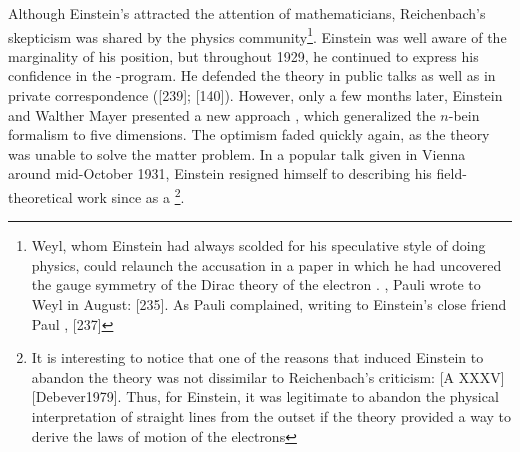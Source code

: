 \documentclass[final]{article}
\newcommand{\nbein}{$n$-bein\xspace}
\newcommand{\FP}{\german{Fernparallelismus}\xspace}
\begin{document}
Although Einstein's \FP attracted the attention of mathematicians, Reichenbach's skepticism was shared by the physics community\footnote{Weyl, whom Einstein had always scolded for his speculative style of doing physics, could relaunch the accusation in a paper \citep{Weyl1929c} in which he had uncovered the gauge symmetry of the Dirac theory of the electron . , Pauli wrote to Weyl in August:  [235]. As Pauli complained, writing to Einstein's close friend Paul \Ehr,  [237]}. Einstein was well aware of the marginality of his position, but throughout 1929, he continued to express his confidence in the \FP-program. He defended the theory in public talks \citep{Einstein1930,Einstein1930a,Einstein1930b} as well as in private correspondence ([239]; [140]). However, only a few months later, Einstein and Walther Mayer presented a new approach \citep{Einstein1931}, which generalized the \nbein formalism to five dimensions. The optimism faded quickly again, as the theory was unable to solve the matter problem. In a popular talk given in Vienna around mid-October 1931, Einstein resigned himself to describing his field-theoretical work since \gr as a  \citep[441]{Einstein1932b}\footnote{It is interesting to notice that one of the reasons that induced Einstein to abandon the theory was not dissimilar to Reichenbach's criticism:  [A XXXV][Debever1979]. Thus, for Einstein, it was legitimate to abandon the physical interpretation of straight lines from the outset if the theory provided a way to derive the laws of motion of the electrons}.
\end{document}
